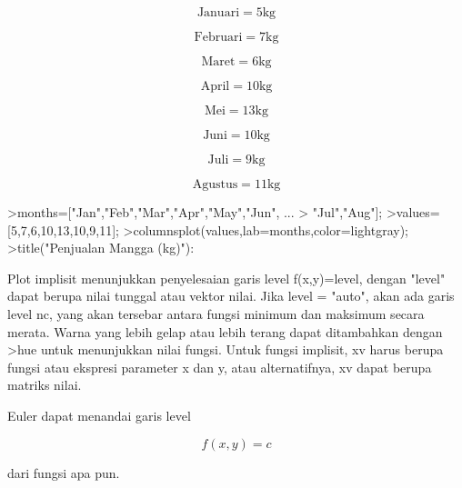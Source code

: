 \documentclass{article}
\begin{document}
\begin{eulernotebook}
\begin{eulercomment}
\begin{eulercomment}
\begin{eulercomment}
\begin{eulercomment}
\begin{eulercomment}
\begin{eulercomment}
\begin{eulercomment}
\begin{eulercomment}
\begin{eulercomment}
\end{eulercomment}
\begin{eulerformula}
\[
\text{Januari}= 5 \text{kg}
\]
\end{eulerformula}
\begin{eulerformula}
\[
\text{Februari}= 7 \text{kg}
\]
\end{eulerformula}
\begin{eulerformula}
\[
\text{Maret} = 6 \text{kg}
\]
\end{eulerformula}
\begin{eulerformula}
\[
\text{April}= 10 \text{kg}
\]
\end{eulerformula}
\begin{eulerformula}
\[
\text{Mei}= 13 \text{kg}
\]
\end{eulerformula}
\begin{eulerformula}
\[
\text{Juni}= 10 \text{kg}
\]
\end{eulerformula}
\begin{eulerformula}
\[
\text{Juli}= 9 \text{kg}
\]
\end{eulerformula}
\begin{eulerformula}
\[
\text{Agustus}= 11 \text{kg}
\]
\end{eulerformula}
\begin{eulerprompt}
>months=["Jan","Feb","Mar","Apr","May","Jun", ...
>  "Jul","Aug"];
>values=[5,7,6,10,13,10,9,11];
>columnsplot(values,lab=months,color=lightgray);
>title("Penjualan Mangga (kg)"):
\end{eulerprompt}
\begin{eulercomment}
Plot implisit menunjukkan penyelesaian garis level f(x,y)=level,
dengan "level" dapat berupa nilai tunggal atau vektor nilai. Jika
level = "auto", akan ada garis level nc, yang akan tersebar antara
fungsi minimum dan maksimum secara merata. Warna yang lebih gelap atau
lebih terang dapat ditambahkan dengan \textgreater{}hue untuk menunjukkan nilai
fungsi. Untuk fungsi implisit, xv harus berupa fungsi atau ekspresi
parameter x dan y, atau alternatifnya, xv dapat berupa matriks nilai.

Euler dapat menandai garis level

\end{eulercomment}
\begin{eulerformula}
\[
f(x,y) = c
\]
\end{eulerformula}
\begin{eulercomment}
dari fungsi apa pun.


\end{eulercomment}
\end{eulercomment}
\end{eulercomment}
\end{eulercomment}
\end{eulercomment}
\end{eulercomment}
\end{eulercomment}
\end{eulercomment}
\end{eulercomment}
\end{eulernotebook}
\end{document}
